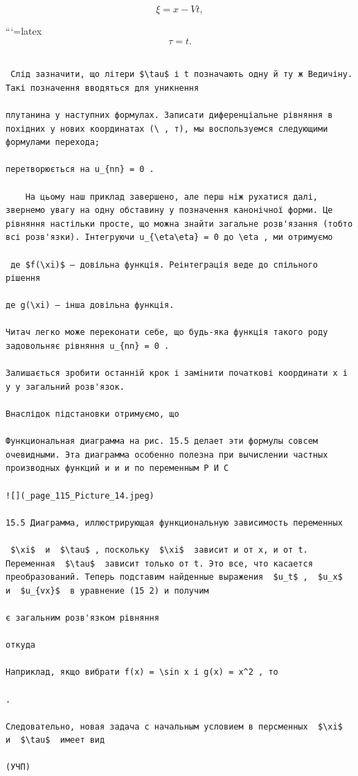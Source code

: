 \documentclass[
  ukrainian,
]{article}
\begin{document}
\[
\xi = x - Vt,
\]

```{=latex}
\[
\tau = t.
\]

\begin{verbatim}

 Слід зазначити, що літери $\tau$ і t позначають одну й ту ж Ведичіну. Такі позначення вводяться для уникнення

плутанина у наступних формулах. Записати диференціальне рівняння в похідних у нових координатах (\ , т), мы воспользуемся следующими формулами перехода;

перетворюється на u_{nn} = 0 .

    На цьому наш приклад завершено, але перш ніж рухатися далі, звернемо увагу на одну обставину у позначення канонічної форми. Це рівняння настільки просте, що можна знайти загальне розв'язання (тобто всі розв'язки). Інтегруючи u_{\eta\eta} = 0 до \eta , ми отримуємо

 де $f(\xi)$ — довільна функція. Реінтеграція веде до спільного рішення

де g(\xi) — інша довільна функція.

Читач легко може переконати себе, що будь-яка функція такого роду задовольняє рівняння u_{nn} = 0 .

Залишається зробити останній крок і замінити початкові координати x і y у загальний розв'язок.

Внаслідок підстановки отримуємо, що

Функциональная диаграмма на рис. 15.5 делает эти формулы совсем очевидными. Эта диаграмма особенно полезна при вычислении частных производных функций и и и по переменным Р И С

![](_page_115_Picture_14.jpeg)

15.5 Диаграмма, иллюстрирующая функциональную зависимость переменных

 $\xi$  и  $\tau$ , поскольку  $\xi$  зависит и от x, и от t. Переменная  $\tau$  зависит только от t. Это все, что касается преобразований. Теперь подставим найденные выражения  $u_t$ ,  $u_x$  и  $u_{vx}$  в уравнение (15 2) и получим

є загальним розв'язком рівняння

откуда

Наприклад, якщо вибрати f(x) = \sin x і g(x) = x^2 , то

.

Следовательно, новая задача с начальным условием в персменных  $\xi$  и  $\tau$  имеет вид

(УЧП)


\end{verbatim}
\end{document}

